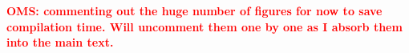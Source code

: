 \documentclass[useAMS,usenatbib]{mn2e}
\newcommand{\OMS}[1]{\textcolor{red}{{\bf OMS: #1}}}
\begin{document}
\OMS{commenting out the huge number of figures for now to save compilation time. Will uncomment them one by one as I absorb them into the main text.}
\end{document}
